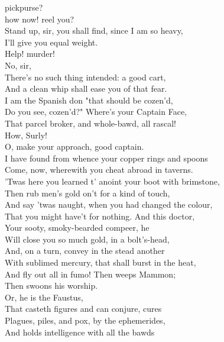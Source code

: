 \documentclass{memoir}
\begin{document}
\begin{drama*}
 pickpurse?\\
 how now! reel you?\\
 Stand up, sir, you shall find, since I am so heavy,\\
 I'll give you equal weight.\\
\subtlespeaks {} Help! murder!\\
\surlyspeaks {} No, sir,\\
 There's no such thing intended: a good cart,\\
 And a clean whip shall ease you of that fear.\\
 I am the Spanish don "that should be cozen'd,\\
 Do you see, cozen'd?" Where's your Captain Face,\\
 That parcel broker, and whole-bawd, all rascal!\\
\facespeaks  How, Surly!\\
\surlyspeaks {} O, make your approach, good captain.\\
 I have found from whence your copper rings and spoons\\
 Come, now, wherewith you cheat abroad in taverns.\\
 'Twas here you learned t' anoint your boot with brimstone,\\
 Then rub men's gold on't for a kind of touch,\\
 And say 'twas naught, when you had changed the colour,\\
 That you might have't for nothing. And this doctor,\\
 Your sooty, smoky-bearded compeer, he\\
 Will close you so much gold, in a bolt's-head,\\
 And, on a turn, convey in the stead another\\
 With sublimed mercury, that shall burst in the heat,\\
 And fly out all in fumo! Then weeps Mammon;\\
 Then swoons his worship.\\
 Or, he is the Faustus,\\
 That casteth figures and can conjure, cures\\
 Plagues, piles, and pox, by the ephemerides,\\
 And holds intelligence with all the bawds\\

\end{drama*}
\end{document}
